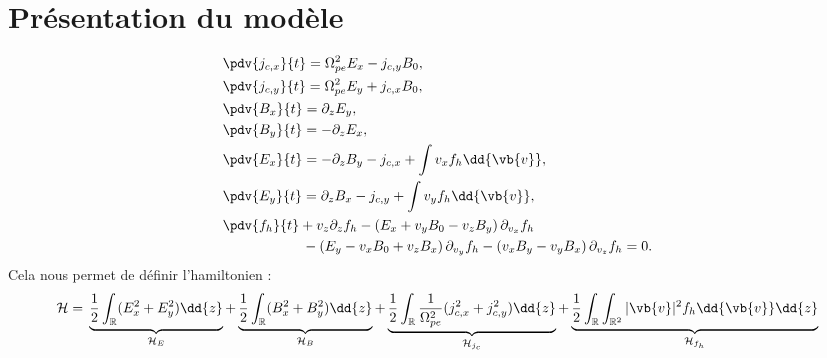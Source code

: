 
\section{Présentation du modèle}

\begin{align}
  \label{eq:VHM:jx}
  &\pdv{j_{c,x}}{t} = \Omega_{pe}^2 { E}_x - { j}_{c,y}B_0,\\
  \label{eq:VHM:jy}
  &\pdv{j_{c,y}}{t} = \Omega_{pe}^2 { E}_y + { j}_{c,x}B_0,\\
  \label{eq:VHM:Bx}
  &\pdv{B_{x  }}{t} = \partial_z E_y,\\
  \label{eq:VHM:By}
  &\pdv{B_{y  }}{t} = -\partial_z E_x,\\
  \label{eq:VHM:Ex}
  &\pdv{E_{x  }}{t} =-\partial_z B_y - {j}_{c,x} + \int v_x f_h \dd{\vb{v}},\\
  \label{eq:VHM:Ey}
  &\pdv{E_{y  }}{t} =\partial_z B_x - {j}_{c,y} + \int v_y f_h \dd{\vb{v}}, \\
  \label{eq:VHM:fh}
  &\pdv{f_{h  }}{t} +  v_z\partial_z f_h - \left(E_x + v_y B_0 - v_zB_y\right)\partial_{v_x} f_h\\
  &\hspace{2cm}- \left(E_y - v_x B_0 + v_z B_x\right)\partial_{v_y} f_h- \left(v_x B_y- v_y B_x\right)\partial_{v_z} f_h = 0.\nonumber
\end{align}
Cela nous permet de définir l'hamiltonien :
\begin{equation}
  \mathcal{H} = {}
      \underbrace{\frac{1}{2}\int_{\mathbb{R}}(E_x^2+E_y^2) \dd{z}}_{\mathcal{H}_E}
    + \underbrace{\frac{1}{2}\int_{\mathbb{R}}(B_x^2+B_y^2) \dd{z}}_{\mathcal{H}_B}
    + \underbrace{\frac{1}{2}\int_{\mathbb{R}}\frac{1}{\Omega_{pe}^2}(j_{c,x}^2+j_{c,y}^2) \dd{z}}_{\mathcal{H}_{j_c}}
    + \underbrace{\frac{1}{2}\int_{\mathbb{R}}\int_{\mathbb{R}^2}|\vb{v}|^2 f_h \dd{\vb{v}}\dd{z}}_{\mathcal{H}_{f_h}}
  \label{eq:ham1dz3dv}
\end{equation}

